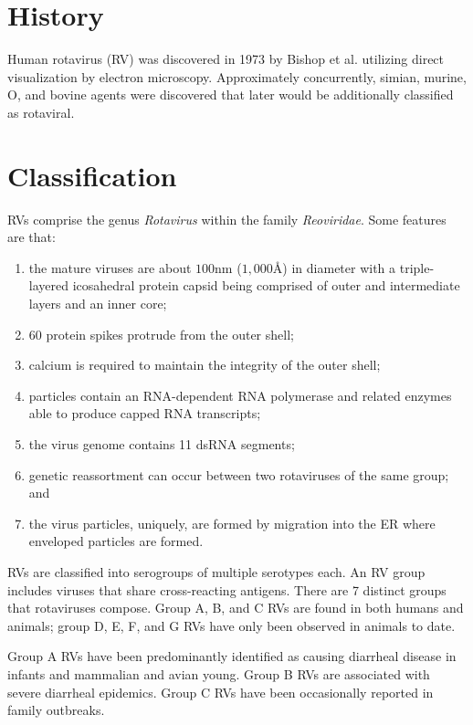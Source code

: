 \documentclass[11pt,final] {article}
\begin{document}
\section{History}

Human rotavirus (RV) was discovered in 1973 by Bishop et al. utilizing direct visualization by electron microscopy. Approximately concurrently, simian, murine, O, and bovine agents were discovered that later would be additionally classified as rotaviral.

\section{Classification}

RVs comprise the genus \textit{Rotavirus} within the family \textit{Reoviridae}. Some features are that:

\begin{enumerate}
	\item the mature viruses are about $100$nm ($1,000$\AA) in diameter with a triple-layered icosahedral protein capsid being comprised of outer and intermediate layers and an inner core;
	\item 60 protein spikes protrude from the outer shell;
	\item calcium is required to maintain the integrity of the outer shell;
	\item particles contain an RNA-dependent RNA polymerase and related enzymes able to produce capped RNA transcripts;
	\item the virus genome contains 11 dsRNA segments;
	\item genetic reassortment can occur between two rotaviruses of the same group; and
	\item the virus particles, uniquely, are formed by migration into the ER where enveloped particles are formed.
\end{enumerate}

RVs are classified into serogroups of multiple serotypes each. An RV group includes viruses that share cross-reacting antigens. There are 7 distinct groups that rotaviruses compose. Group A, B, and C RVs are found in both humans and animals; group D, E, F, and G RVs have only been observed in animals to date.

Group A RVs have been predominantly identified as causing diarrheal disease in infants and mammalian and avian young. Group B RVs are associated with severe diarrheal epidemics. Group C RVs have been occasionally reported in family outbreaks.
\end{document}
